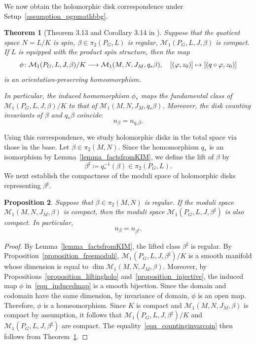 \documentclass[11pt]{amsart}
\theoremstyle{plain}
\newtheorem{theorem}{Theorem}[section]
\newtheorem{proposition}[theorem]{Proposition}
\theoremstyle{definition}
\theoremstyle{remark}
\numberwithin{equation}{section} \numberwithin{table}{section}
\def\to{\mathchoice{\longrightarrow}{\rightarrow}{\rightarrow}{\rightarrow}}
\numberwithin{equation}{section}
\begin{document}
We now obtain the holomorphic disk correspondence under Setup~\ref{assumption_pgpmathbbg}.

\begin{theorem}[Theorem 3.13 and Corollary 3.14 in \cite{Kim26}] \label{theorem_fundacycle}
Suppose that the quotient space $N = L / K$ is spin, $\beta \in \pi_2(P_{G}, L)$ is regular, $\mathcal{M}_1(P_G, L, J, \beta)$ is compact. If $L$ is equipped with the product spin structure, then the map
$$
\phi \colon \mathcal{M}_1(P_{G},L,J,\beta)/K \to \mathcal{M}_1(M, N, J_M, q_* \beta), \quad [(\varphi, z_0)] \mapsto  [(q \circ \varphi, z_0)] 
$$
is an orientation-preserving homeomorphism. 

In particular, the induced homomorphism $\phi_*$ maps the fundamental class of $\mathcal{M}_1(P_{G},L,J,\beta)/K$ to that of $\mathcal{M}_1(M, N, J_M, q_* \beta)$. Moreover, the disk counting invariants of $\beta$ and $q_* \beta$ coincide$\colon$
$$
n_\beta = n_{q_* \beta}.
$$
\end{theorem}

Using this correspondence, we study holomorphic disks in the total space via those in the base. Let $\beta \in \pi_2(M,N)$. Since the homomorphism $q_*$ is an isomorphism by Lemma~\ref{lemma_factsfromKIM}, we define the lift of $\beta$ by 
\begin{equation}\label{equ_liftedclass}
\beta^\sharp \coloneqq q_*^{-1} (\beta) \in \pi_2(P_G, L).
\end{equation}
We next establish the compactness of the moduli space of holomorphic disks representing $\beta^\sharp$. 

\begin{proposition}\label{prop_liftingmoduli}
Suppose that $\beta \in \pi_2(M,N)$ is regular. If the moduli space $\mathcal{M}_1(M, N, J_M, \beta)$ is compact, then the moduli space $\mathcal{M}_1(P_G,L,J,\beta^\sharp)$ is also compact. In particular, 
\begin{equation}\label{equ_countinginvarcoin}
n_{\beta} = n_{\beta^\sharp}.
\end{equation}
\end{proposition}

\begin{proof} 
By Lemma~\ref{lemma_factsfromKIM}, the lifted class $\beta^\sharp$ is regular. By Proposition~\ref{proposition_freemoduli}, $\mathcal{M}_1(P_{G},L,J,\beta^\sharp) / K$ is a smooth manifold whose dimension is equal to $\dim \mathcal{M}_1(M, N, J_M, \beta)$. Moreover, by Propositions~\ref{proposition_liftingholo} and~\ref{proposition_injective}, the induced map $\phi$ in~\eqref{equ_inducedmap} is a smooth bijection. Since the domain and codomain have the same dimension, by invariance of domain, $\phi$ is an open map. Therefore, $\phi$ is a homeomorphism. Since $K$ is compact and $\mathcal{M}_1(M, N, J_M, \beta)$ is compact by assumption, it follows that $\mathcal{M}_1(P_G, L, J, \beta^\sharp)/K$ and $\mathcal{M}_1(P_G, L, J, \beta^\sharp)$ are compact. The equality~\eqref{equ_countinginvarcoin} then follows from Theorem~\ref{theorem_fundacycle}.
\end{proof}
\end{document}
